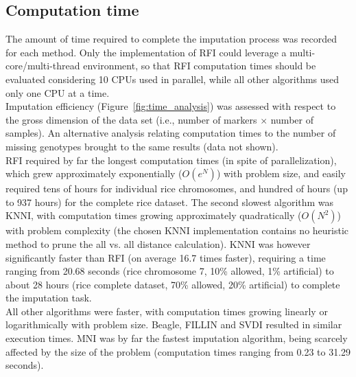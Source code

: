 \subsection{Computation time}
\label{sec:computation_time}  
The amount of time required to complete the imputation process was recorded for each method. Only the implementation of RFI could leverage a multi-core/multi-thread environment, so that RFI computation times should be evaluated considering 10 CPUs used in parallel, while all other algorithms used only one CPU at a time.\\
Imputation efficiency (Figure~\ref{fig:time_analysis}) was assessed with respect to the gross dimension of the data set (i.e., number of markers $\times$ number of samples). An alternative analysis relating computation times to the number of missing genotypes brought to the same results (data not shown).\\
RFI required by far the longest computation times (in spite of parallelization), which grew approximately exponentially ($O(e^N)$) with problem size, and easily required tens of hours for individual rice chromosomes, and hundred of hours (up to 937 hours) for the complete rice dataset. The second slowest algorithm was KNNI, with computation times growing approximately quadratically ($O(N^2)$) with problem complexity (the chosen KNNI implementation contains no heuristic method to prune the all vs. all distance calculation). KNNI was however significantly faster than RFI (on average 16.7 times faster), requiring a time ranging from 20.68 seconds (rice chromosome 7, 10\% allowed, 1\% artificial) to about 28 hours (rice complete dataset, 70\% allowed, 20\% artificial) to complete the imputation task.\\
All other algorithms were faster, with computation times growing linearly or logarithmically with problem size. Beagle, FILLIN and SVDI resulted in similar execution times. MNI was by far the fastest imputation algorithm, being scarcely affected by the size of the problem (computation times ranging from 0.23 to 31.29 seconds).

